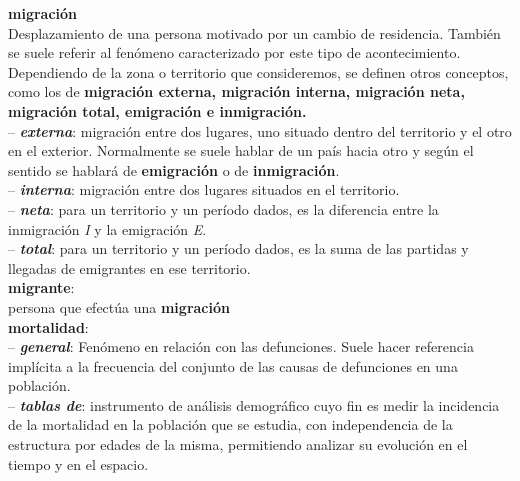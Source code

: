 \begin{multicols}{2}
\noindent \textbf{\Large{migraci\'on}}\\

\vspace{-0.3cm}
Desplazamiento de una persona motivado por un cambio de residencia. Tambi\'en se suele referir al fen\'omeno caracterizado por este tipo de acontecimiento. Dependiendo de la zona o territorio que consideremos, se definen otros conceptos, como los de \textbf{migraci\'on externa, migraci\'on interna, migraci\'on neta, migraci\'on total, emigraci\'on e inmigraci\'on.}\\

\vspace{-0.3cm}
-- \textbf{\textit{externa}}: migraci\'on entre dos lugares, uno situado dentro del territorio y el otro en el exterior. Normalmente se suele hablar de un pa\'is hacia otro y seg\'un el sentido se hablar\'a de \textbf{emigraci\'on} o de \textbf{inmigraci\'on}.\\

\vspace{-0.3cm}
-- \textbf{\textit{interna}}: migraci\'on entre dos lugares situados en el territorio.\\

\vspace{-0.3cm}
-- \textbf{\textit{neta}}: para un territorio y un período dados, es la diferencia entre la inmigración \textit{I} y la emigración \textit{E}.\\

\vspace{-0.3cm}
-- \textbf{\textit{total}}: para un territorio y un período dados, es la suma de las partidas y llegadas de emigrantes en ese territorio.\\

\noindent \textbf{\Large{migrante}}:\\

\vspace{-0.3cm}
persona que efectúa una \textbf{migración}\\

\noindent \textbf{\Large{mortalidad}}:\\

\vspace{-0.3cm}
-- \textbf{\textit{general}}: Fenómeno en relación con las defunciones. Suele hacer referencia implícita a la frecuencia del conjunto de las causas de defunciones en una población.\\

\vspace{-0.3cm}
-- \textbf{\textit{tablas de}}: instrumento de análisis demográfico cuyo fin es medir la incidencia de la mortalidad en la población que se estudia, con independencia de la estructura por edades de la misma, permitiendo analizar su evolución en el tiempo y en el espacio.\\


\end{multicols}
